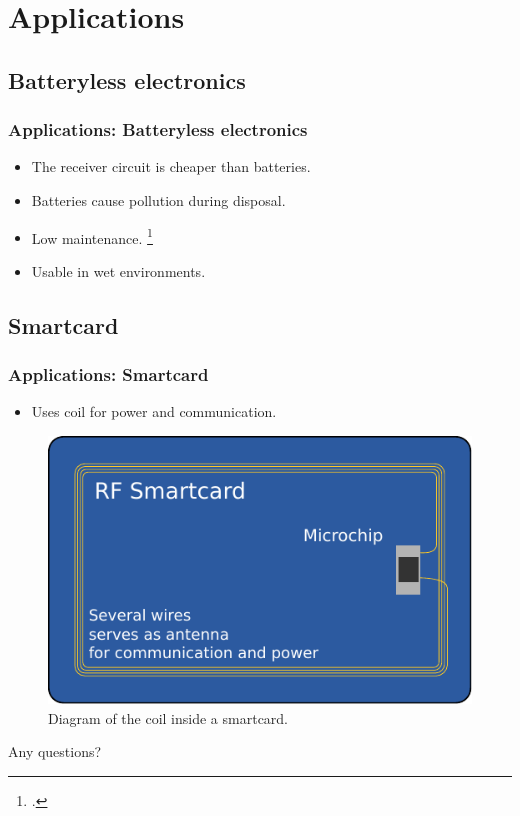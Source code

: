 \documentclass{beamer}
\begin{document}
\section{Applications}

\subsection{Batteryless electronics}
\begin{frame}
  \frametitle{Applications: Batteryless electronics}
  \begin{itemize}
    \item The receiver circuit is cheaper than batteries.
    \item Batteries cause pollution during disposal.
    \item Low maintenance. \footcite{Batteries}
    \item Usable in wet environments.
  \end{itemize}
\end{frame}

\subsection{Smartcard}
\begin{frame}
  \frametitle{Applications: Smartcard}
  \begin{itemize}
    \item Uses coil for power and communication.
  \end{itemize}
    \begin{figure}
      \includegraphics[scale=0.75]{images/smartcard.pdf}
      \caption{Diagram of the coil inside a smartcard. \textcite{wikiRIC}}
    \end{figure}
\end{frame}

\begin{frame}
  \center Any questions?
\end{frame}
\end{document}
